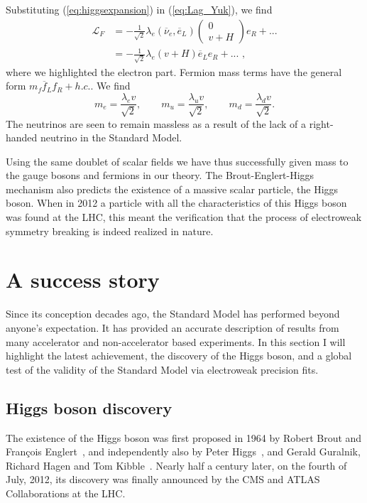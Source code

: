 Substituting (\ref{eq:higgsexpansion}) in (\ref{eq:Lag_Yuk}), we find 
\begin{align}
  \mathcal{L}_F &= - \frac{1}{\sqrt{2}} \lambda_e (\overline{\nu}_e, \overline{e}_L) 
		  \begin{pmatrix}0 \\ v+H \end{pmatrix} e_R + ... \\
                &= - \frac{1}{\sqrt{2}} \lambda_e (v+H) \overline{e}_L e_R + ... \textrm{ ,}
  \label{eq:yukawa}
\end{align}
where we highlighted the electron part. 
Fermion mass terms have the general form $m_f \overline{f}_L f_R + h.c.$. We find
\begin{equation}
m_e = \frac{\lambda_e v}{\sqrt{2}}, \qquad m_u = \frac{\lambda_u v}{\sqrt{2}}, \qquad m_d =
\frac{\lambda_d v}{\sqrt{2}}. \label{eq:fermion_masses}
\end{equation}
The neutrinos are seen to remain massless as a result of the lack of a right-handed neutrino in the
Standard Model. 

Using the same doublet of scalar fields we have thus successfully given mass to the gauge bosons and
fermions in our theory. The Brout-Englert-Higgs mechanism also predicts the existence of a massive
scalar particle, the Higgs boson. 
When in 2012 a particle with all the characteristics of this Higgs boson was found at the LHC, this
meant the verification that the process of electroweak symmetry breaking is indeed realized in
nature. 


\section{A success story \label{sec:SM_success}}

Since its conception decades ago, the Standard Model has performed beyond anyone's expectation. 
It has provided an accurate description of results from many accelerator and non-accelerator based
experiments. In this section I will highlight the latest achievement, the discovery of the Higgs
boson, and a global test of the validity of the Standard Model via electroweak precision fits. 

\subsection{Higgs boson discovery}

The existence of the Higgs boson was first proposed in 1964 by Robert Brout and Fran\c{c}ois
Englert~\cite{Englert:1964et}, and independently also by Peter Higgs~\cite{Higgs:1964pj}, and
Gerald Guralnik, Richard Hagen and Tom Kibble~\cite{Guralnik:1964eu}. 
Nearly half a century later, on the fourth of July, 2012, its discovery was finally announced by the
CMS and ATLAS Collaborations at the LHC.

